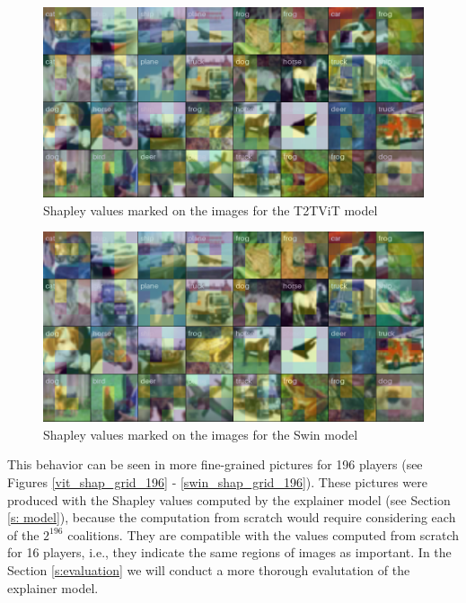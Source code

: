 \documentclass[magisterska,en]{pracamgr}
\begin{document}
\begin{figure}[H]
\centering
\includegraphics[scale=0.5]{./images/t2t_vit_shap_grid.png}
\caption{Shapley values marked on the images for the T2T\textunderscore  ViT model}
\label{t2t_vit_shap_grid}
\end{figure}


\begin{figure}[H]
\centering
\includegraphics[scale=0.5]{./images/swin_shap_grid.png}
\caption{Shapley values marked on the images for the Swin model}
\label{swin_shap_grid}
\end{figure}



This behavior can be seen in more fine-grained pictures for 196 players (see Figures \ref{vit_shap_grid_196} - \ref{swin_shap_grid_196}). These pictures were produced with the Shapley values computed by the explainer model (see Section \ref{s: model}), because the computation from scratch would require considering each of the $2^{196}$ coalitions. They are compatible with the values computed from scratch for 16 players, i.e., they indicate the same regions of images as important. In the Section \ref{s:evaluation} we will conduct a more thorough evalutation of the explainer model.
\end{document}
